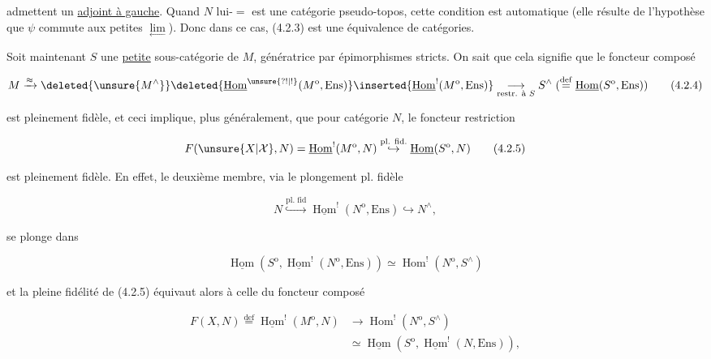 
admettent un \uline{adjoint à gauche}. Quand $N$ lui-$=$ est une catégorie pseudo-topos, cette condition est automatique (elle résulte de l'hypothèse que $\psi$ commute aux petites $\underset{\longleftarrow}{\lim}$). Donc dans ce cas, (4.2.3) est une équivalence de catégories.

Soit maintenant $S$  une \uline{petite} sous-catégorie de $M$, génératrice par épimorphismes stricts. On sait que cela signifie que le foncteur composé

\[
M\xrightarrow{\approx}
\deleted{\unsure{M^{\wedge}}}
\deleted{\underline{\operatorname{Hom}}^{\unsure{? !|!}}(M^{\mathrm{o}},\mathrm{Ens})}
\inserted{\underline{\operatorname{Hom}}^{!}(M^{\mathrm{o}},\mathrm{Ens})}
\underset{\text{restr. à }S}{\longrightarrow}
S^{\wedge}\;(\overset{\mathrm{def}}{=}\underline{\operatorname{Hom}}(S^{\mathrm{o}},\mathrm{Ens}))
\tag*{(4.2.4)}
\]

est pleinement fidèle, et ceci implique, plus généralement, que pour   catégorie $N$, le foncteur restriction

\[
F(\unsure{X|\mathcal X},N)=\underline{\operatorname{Hom}}^{!}(M^{\mathrm{o}},N)
\overset{\text{pl. fid.}}{\hookrightarrow}\underline{\operatorname{Hom}}(S^{\mathrm{o}},N)
\tag*{(4.2.5)}
\]

est pleinement fidèle. En effet, le deuxième membre, via le plongement pl. fidèle

\[
N\overset{\text{pl. fid}}{\hookrightarrow}\underline{\operatorname{Hom}}^{!}(N^{\mathrm{o}},\mathrm{Ens})\hookrightarrow N^{\wedge},
\]

 se plonge dans

\[
\underline{\operatorname{Hom}}(S^{\mathrm{o}},\underline{\operatorname{Hom}}^{!}(N^{\mathrm{o}},\mathrm{Ens}))
\simeq \operatorname{Hom}^{!}(N^{\mathrm{o}},S^{\wedge})
\]

et la pleine fidélité de (4.2.5) équivaut alors à celle du foncteur composé

\[
\begin{aligned}
F(X,N)\overset{\mathrm{def}}{=}\underline{\operatorname{Hom}}^{!}(M^{\mathrm{o}},N)&\longrightarrow
\operatorname{Hom}^{!}(N^{\mathrm{o}},S^{\wedge})\\
&\simeq\underline{\operatorname{Hom}}(S^{\mathrm{o}},\underline{\operatorname{Hom}}^{!}(N,\mathrm{Ens})),
\end{aligned}
\tag*{(4.2.6)}
\]
